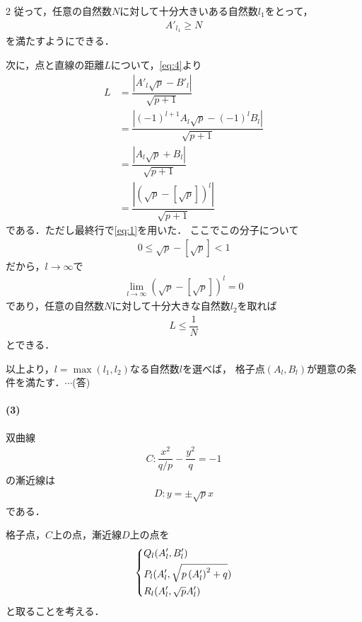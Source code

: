 \documentclass[../../main.tex]{subfiles}
\begin{document}
\begin{multicols}{2}
  従って，任意の自然数$N$に対して十分大きいある自然数$l_1$をとって，
  \begin{align}
    A'_{l_1} \ge N
  \end{align}
  を満たすようにできる．

  次に，点と直線の距離$L$について，\cref{eq:4}より
  \begin{align}
    L
    & =\dfrac{\left|A'_{l}\sqrt{p}-B'_{l}\right|}{\sqrt{p+1}}                             \\
    & =\dfrac{\left|(-1)^{l+1}A_{l}\sqrt{p}-(-1)^{l}B_{l}\right|}{\sqrt{p+1}}             \\
    & =\dfrac{\left|A_{l}\sqrt{p}+B_{l}\right|}{\sqrt{p+1}}                               \\
    & =\dfrac{\left|\left(\sqrt{p} - \left[\sqrt{p}\right]\right)^{l}\right|}{\sqrt{p+1}}
  \end{align}
  である．ただし最終行で\cref{eq:1}を用いた．
  ここでこの分子について
  \begin{align}
    0 \le \sqrt{p} - \left[\sqrt{p}\right] < 1
  \end{align}
  だから，$l\to\infty$で
  \begin{align}
    \lim_{l\to\infty}\left(\sqrt{p} - \left[\sqrt{p}\right]\right)^{l} = 0
  \end{align}
  であり，任意の自然数$N$に対して十分大きな自然数$l_2$を取れば
  \begin{align}
    L \le \dfrac{1}{N}
  \end{align}
  とできる．

  以上より，$l=\max(l_1,l_2)$なる自然数$l$を選べば，
  格子点$(A_{l},B_{l})$が題意の条件を満たす．$\cdots$(答)

  \paragraph{(3)}
  双曲線
  \begin{align}
    C: \dfrac{x^{2}}{q/p} - \dfrac{y^{2}}{q} = -1
  \end{align}
  の漸近線は
  \begin{align}
    D: y = \pm\sqrt{p}x
  \end{align}
  である．

  格子点，$C$上の点，漸近線$D$上の点を
  \begin{align}
    \begin{dcases}
      Q_l(A'_{l},B'_{l})                                \\
      P_{l}(A'_{l}, \sqrt{p \left(A'_{l}\right)^{2}+q}) \\
      R_{l}(A'_{l}, \sqrt{p} A'_{l})
    \end{dcases}
  \end{align}
  と取ることを考える．


\end{multicols}
\end{document}
